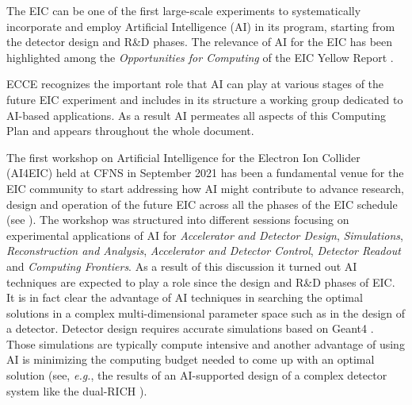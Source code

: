 



The EIC can be one of the first large-scale experiments to systematically incorporate and employ Artificial Intelligence (AI) in its program, starting from the detector design and R\&D phases. 
The relevance of AI for the EIC has been highlighted among the \textit{Opportunities for Computing} of the EIC Yellow Report \cite{eic_yellow_report_v1_1}.

ECCE recognizes the important role that AI can play at various stages of the future EIC experiment and includes in its structure a working group dedicated to AI-based applications. 
As a result AI permeates all aspects of this Computing Plan and appears throughout the whole document.

The first workshop on Artificial Intelligence for the Electron Ion Collider (AI4EIC) held at CFNS in September 2021 \cite{AI4EIC_workshop} has been a fundamental venue for the EIC community to start addressing how AI might contribute to advance research, design and operation of the future EIC across all the phases of the EIC schedule (see \cite{AI4EIC_future}).
The workshop was structured into different sessions focusing on experimental applications of AI for \textit{Accelerator and Detector Design}, \textit{Simulations}, \textit{Reconstruction and Analysis}, \textit{Accelerator and Detector Control}, \textit{Detector Readout} and \textit{Computing Frontiers}. 
%
As a result of this discussion it turned out AI techniques are expected to play a role since the design and R\&D phases of EIC. 
It is in fact clear the advantage of AI techniques in searching the optimal solutions in a complex multi-dimensional parameter space such as in the design of a detector. Detector design requires accurate simulations based on Geant4 \cite{ALLISON2016186}. Those simulations are typically compute intensive and another advantage of using AI is minimizing the computing budget needed to come up with an optimal solution (see, \textit{e.g.}, the results of an AI-supported design of a complex detector system like the dual-RICH \cite{cisbani2020ai}).


